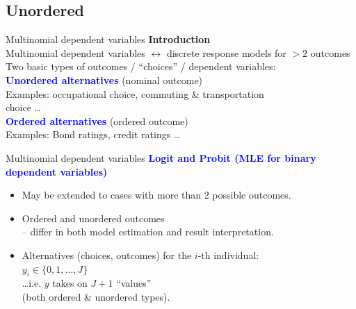 \documentclass[usenames,dvipsnames]{beamer}
\begin{document}
\subsection{Unordered}

\begin{frame}{Multinomial dependent variables}
\textbf{Introduction} \\
\bigskip
Multinomial dependent variables $\leftrightarrow$ discrete response models for $ > 2$ outcomes\\
\medskip
Two basic types of outcomes / ``choices'' / dependent variables:\\
\bigskip
\textcolor{Blue}{\textbf{Unordered alternatives}} (nominal outcome) \\
\quad Examples: occupational choice, commuting \& transportation\\ \quad choice \dots \\
\medskip
\textcolor{Blue}{\textbf{Ordered alternatives}} (ordered outcome) \\
\quad Examples: Bond ratings, credit ratings \dots
\end{frame}
\begin{frame}{Multinomial dependent variables}
\textcolor{Blue}{\textbf{Logit and Probit (MLE for binary dependent variables)}}\\
\begin{itemize}
\item May be extended to cases with more than 2 possible outcomes. \\
\medskip
\item Ordered and unordered outcomes\\
– differ in both model estimation and result interpretation. \\
\vspace{0.8cm}
\item Alternatives (choices, outcomes) for the $i$-th individual: \\$y_i \in \{ 0,1, \dots, J \}$ \\
\vspace{0.3cm}
\dots \quad i.e. $y$ takes on $J+1$ ``values'' 
\\ \qquad (both ordered \& unordered types).
\end{itemize}
\end{frame}
\end{document}
